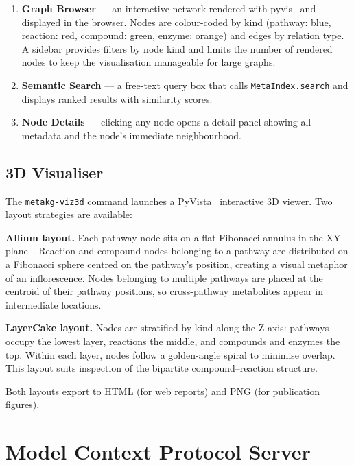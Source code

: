 \documentclass[10pt]{article}
\begin{document}
\begin{enumerate}[leftmargin=*,itemsep=2pt]
  \item \textbf{Graph Browser} --- an interactive network rendered with
    pyvis~\citep{pyvis2021} and displayed in the browser. Nodes are
    colour-coded by kind (pathway: blue, reaction: red, compound: green,
    enzyme: orange) and edges by relation type. A sidebar provides filters
    by node kind and limits the number of rendered nodes to keep the
    visualisation manageable for large graphs.
  \item \textbf{Semantic Search} --- a free-text query box that calls
    \texttt{MetaIndex.search} and displays ranked results with similarity
    scores.
  \item \textbf{Node Details} --- clicking any node opens a detail panel
    showing all metadata and the node's immediate neighbourhood.
\end{enumerate}

\subsection{3D Visualiser}

The \texttt{metakg-viz3d} command launches a PyVista~\citep{sullivan2019pyvista}
interactive 3D viewer. Two layout strategies are available:

\textbf{Allium layout.} Each pathway node sits on a flat Fibonacci annulus in
the XY-plane~\citep{vogel1979fibonacci}. Reaction and compound nodes belonging
to a pathway are distributed on a Fibonacci sphere centred on the pathway's
position, creating a visual metaphor of an inflorescence. Nodes belonging to
multiple pathways are placed at the centroid of their pathway positions, so
cross-pathway metabolites appear in intermediate locations.

\textbf{LayerCake layout.} Nodes are stratified by kind along the Z-axis:
pathways occupy the lowest layer, reactions the middle, and compounds and
enzymes the top. Within each layer, nodes follow a golden-angle spiral to
minimise overlap. This layout suits inspection of the bipartite
compound--reaction structure.

Both layouts export to HTML (for web reports) and PNG (for publication
figures).

\section{Model Context Protocol Server}
\label{sec:mcp}
\end{document}
